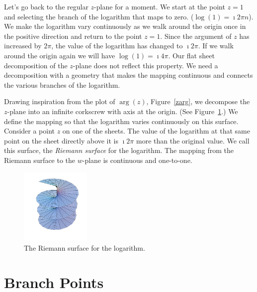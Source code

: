 Let's go back to the regular $z$-plane for a moment.
We start at the point $z = 1$ and selecting the branch of the logarithm
that maps to zero.  ($\log(1) = \imath 2 \pi n$).  We make the logarithm
vary continuously as we walk around the origin once in the positive 
direction and return to the point $z = 1$.  Since the argument of $z$
has increased by $2 \pi$, the value of the logarithm has changed to
$\imath 2 \pi$.  If we walk around the origin again we will have 
$\log(1) = \imath 4 \pi$.  Our flat sheet decomposition of the $z$-plane
does not reflect this property.  We need a decomposition with a 
geometry that makes the mapping continuous and connects the various 
branches of the logarithm.


Drawing inspiration from the plot of $\arg(z)$, Figure~\ref{zarg}, we 
decompose the $z$-plane into an infinite corkscrew with axis at the 
origin.  (See Figure~\ref{figure riemann-logz}.)   We define the mapping
so that the logarithm varies continuously on this surface.  
Consider a point $z$ on one of the sheets.  The value of the logarithm 
at that same point on the sheet directly above it is $\imath 2 \pi$ more than 
the original value.  We call this surface, the 
\textit{Riemann surface} for the logarithm.  The mapping from the
Riemann surface to the $w$-plane is continuous and one-to-one.

\begin{figure}[htbp!]
  \begin{center}
    \includegraphics[width=0.3\textwidth]{fcv/function/riemann-logz}
  \end{center}
  \caption{The Riemann surface for the logarithm.}
  \label{figure riemann-logz}
\end{figure}







\section{Branch Points}
\label{chapter function section branch points}


